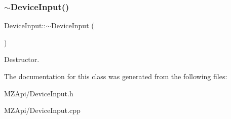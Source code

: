 \subsubsection{\texorpdfstring{$\sim$\+Device\+Input()}{~DeviceInput()}}
{\footnotesize\ttfamily Device\+Input\+::$\sim$\+Device\+Input (\begin{DoxyParamCaption}{ }\end{DoxyParamCaption})}

Destructor. 

The documentation for this class was generated from the following files\+:\begin{DoxyCompactItemize}
\item 
M\+Z\+Api/Device\+Input.\+h\item 
M\+Z\+Api/Device\+Input.\+cpp\end{DoxyCompactItemize}
